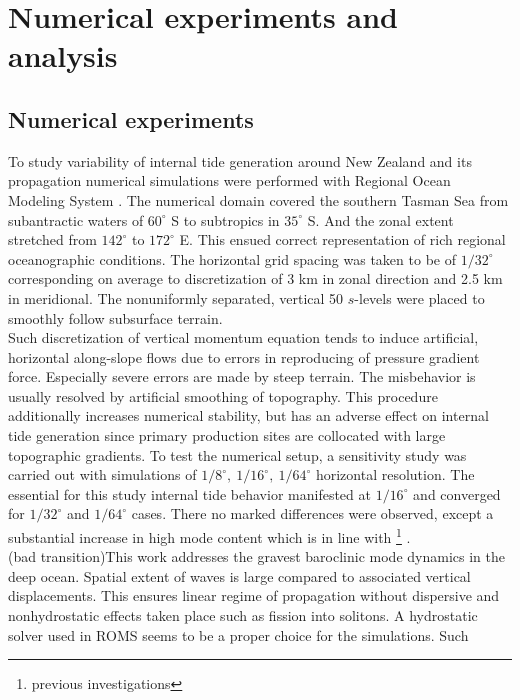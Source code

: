 \documentclass[12pt]{article}
\begin{document}
\newpage

\section{Numerical experiments and analysis}
\subsection{Numerical experiments}
To study variability of internal tide generation around New Zealand and its propagation numerical 
simulations were performed with Regional Ocean Modeling System \citep{shchepetkin2005regional}. 
The numerical domain covered the southern Tasman Sea from subantractic waters of $60^{\circ}$ S 
to subtropics in $35^{\circ}$ S. And the zonal extent stretched from $142^{\circ}$ to $172^{\circ}$ 
E. This ensued correct representation of rich regional oceanographic conditions. The horizontal 
grid spacing was taken to be of $1/32^{\circ}$ corresponding on average to discretization of 3 km 
in zonal direction and 2.5 km in meridional. The nonuniformly separated, vertical 50 $s$-levels 
were placed to smoothly follow subsurface terrain.\\
Such discretization of vertical momentum equation tends to induce artificial, horizontal  
along-slope flows \citep{haidvogel1999numerical} due to errors in reproducing of pressure 
gradient force. Especially severe errors are made by steep terrain. The misbehavior is usually 
resolved by artificial smoothing of topography. This procedure additionally increases numerical 
stability, but has an adverse effect on internal tide generation \citep{di2006numerical} since 
primary production sites are collocated with large topographic gradients. To test the numerical 
setup, a sensitivity study was carried out with simulations of 
$1/8^{\circ},~1/16^{\circ},~1/64^{\circ}$ horizontal resolution. The essential for this study 
internal tide behavior manifested at $1/16^{\circ}$ and converged for $1/32^{\circ}$ and 
$1/64^{\circ}$ cases. There no marked differences were observed, except a substantial increase in 
high mode content which is in line with \footnote{previous investigations} 
\citep{di2006numerical}.\\
(bad transition)This work addresses the gravest baroclinic mode dynamics in the deep ocean. Spatial 
extent of 
waves is large compared to associated vertical displacements. This ensures linear regime of 
propagation without dispersive and nonhydrostatic effects taken place such as fission into 
solitons. A hydrostatic solver used in ROMS seems to be a proper choice for the simulations. Such 
\end{document}
